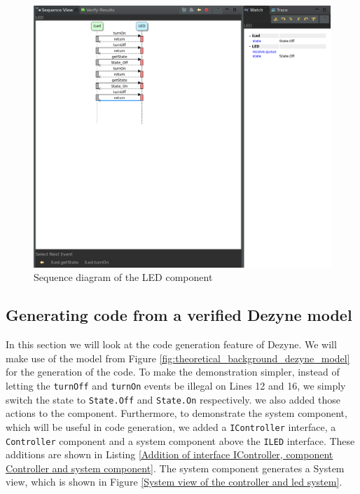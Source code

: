 \documentclass[12pt]{scrreprt}
\begin{document}
\begin{figure}[H]
    \centering
    \includegraphics[width=\textwidth]{Figures/theoretical_background/simulation_of_led.png}
    \caption{Sequence diagram of the LED component}
    \label{Sequence diagram of the LED component}
\end{figure}


\subsection{Generating code from a verified Dezyne model}
\label{Generating code from a verified Dezyne model}
    In this section we will look at the code generation feature of Dezyne. We will make use of the model from Figure \ref{fig:theoretical_background_dezyne_model} for the generation of the code. To make the demonstration simpler, instead of letting the \texttt{turnOff} and \texttt{turnOn} events be illegal on Lines 12 and 16, we simply switch the state to \texttt{State.Off} and \texttt{State.On} respectively. we also added those actions to the component. Furthermore, to demonstrate the system component, which will be useful in code generation, we added a \texttt{IController} interface, a \texttt{Controller} component and a system component above the \texttt{ILED} interface. These additions are shown in Listing \ref{Addition of interface IController, component Controller and system component}. The system component generates a System view, which is shown in Figure \ref{System view of the controller and led system}.
    
\end{document}
